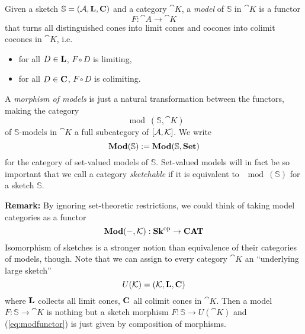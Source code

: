 \begin{Definition}
Given a sketch $\mathbb S = (\mathcal{A}, \textbf{L}, \textbf{C})$ and a category $\cat K$, a \emph{model} of $\mathbb S$ in $\cat K$ is a functor
\[ F : \cat A \to \cat K \]
that turns all distinguished cones into limit cones and cocones into colimit cocones in $\cat K$, i.e. \begin{itemize}
\item for all $D \in \textbf{L}$, $F \circ D$ is limiting,
\item for all $D \in \textbf{C}$, $F \circ D$ is colimiting.
\end{itemize}

A \emph{morphism of models} is just a natural transformation between the functors, making the category \[ \mod(\mathbb S, \cat K) \]
of $\mathbb S$-models in $\cat K$ a full subcategory of $[\mathcal{A},\mathcal{K}]$. We write
\[ \mathbf{Mod}(\mathbb S) := \mathbf{Mod}(\mathbb S, \mathbf{Set}) \]
for the category of set-valued models of $\mathbb S$. Set-valued models will in fact be so important that we call a category \emph{sketchable} if it is equivalent to $\mod(\mathbb S)$ for a sketch $\mathbb S$.
\end{Definition}

\textbf{Remark: } By ignoring set-theoretic restrictions, we could think of taking model categories as a functor
\begin{equation}
\label{eq:modfunctor} \mathbf{Mod}(-, \mathcal{K}) : \mathbf{Sk}^{\textrm{op}} \to \mathbf{CAT}
\end{equation}
Isomorphism of sketches is a stronger notion than equivalence of their categories of models, though. Note that we can assign to every category $\cat K$ an ``underlying large sketch'' 
\[ U(\mathcal{K}) = (\mathcal{K}, \textbf{L}, \textbf{C}) \]
where $\textbf{L}$ collects all limit cones, $\textbf{C}$ all colimit cones in $\cat K$. Then a model $F : \mathbb S \to \cat K$ is nothing but a sketch morphism $F : \mathbb S \to U(\cat K)$ and (\ref{eq:modfunctor}) is just given by composition of morphisms. \\

